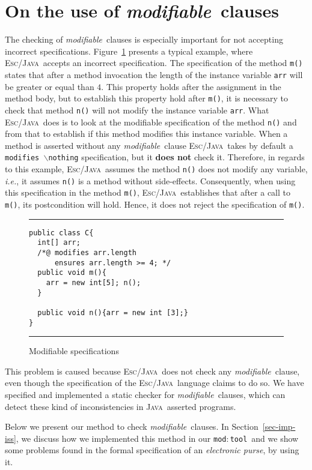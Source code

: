 \documentclass[a4paper]{llncs}
\newcommand{\escj}{\textsc{Esc/Java}}
\newcommand{\java}{\textsc{Java}}
\newcommand{\modtool}{\texttt{mod$:$tool}}
\newcommand{\modif}{\textit{modifiable}}
\begin{document}
\section{On the use of \modif~clauses}
\label{sec-sem-mod-cla}
The checking of \modif~clauses is especially important for not
accepting incorrect specifications. Figure~\ref{fig-mod-spe} presents
a typical example, where \escj~accepts an incorrect specification. The
specification of the method
\texttt{m()} states that after a method invocation the length of the
instance variable \texttt{arr} will be greater or equal than $4$. This
property holds after the assignment in the
method body, but to establish this property hold after \texttt{m()},
it is
necessary to check that method \texttt{n()} will not modify the
instance variable \texttt{arr}. What \escj~does is to look at the
modifiable specification of the method \texttt{n()} and from that to
establish
if this method modifies this instance variable. When a method is
asserted without any \modif~clause \escj~takes by default a
\texttt{modifies $\backslash$nothing} specification, but it {\bf does
not} check it. Therefore, in regards to this example, \escj~assumes
the method \texttt{n()} does not modify any variable, \emph{i.e.}, it
assumes \texttt{n()} is a method without side-effects. Consequently,
when using this specification in the method \texttt{m()},
\escj~establishes that after a call to \texttt{m()}, its
postcondition will hold. Hence, it does not reject the specification of
\texttt{m()}.
\begin{figure}[tbh]
\rule{\linewidth}{0.25mm}
\begin{verbatim}
public class C{
  int[] arr;
  /*@ modifies arr.length
      ensures arr.length >= 4; */
  public void m(){
    arr = new int[5]; n();
  }

  public void n(){arr = new int [3];}
}
\end{verbatim}
\caption{Modifiable specifications} 
\label{fig-mod-spe} 
\rule{\linewidth}{0.25mm} 
\end{figure} 
This problem is caused because \escj~does not check any \modif~clause,
even though the specification of the \escj~language claims to do so. We
have specified and implemented a static checker for \modif~clauses,
which can detect these kind of inconsistencies in \java~asserted
programs. 

Below we present our method to check \modif~clauses. In
Section~\ref{sec-imp-iss}, we discuss how we implemented this method
in our \modtool~and we show
some problems found in the formal specification of an
\emph{electronic purse}, by using it.
\end{document}
